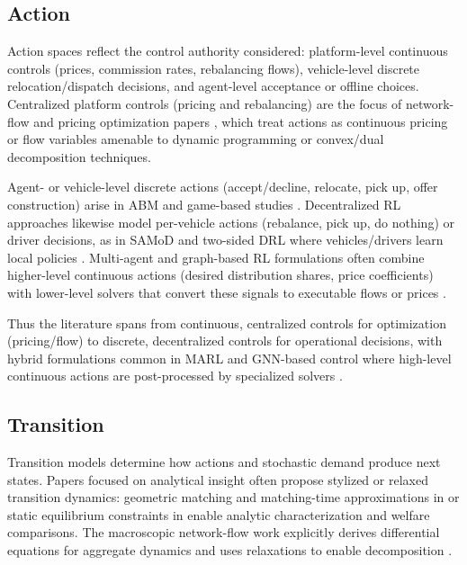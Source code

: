 \subsection{Action}
Action spaces reflect the control authority considered: platform-level continuous controls (prices, commission rates, rebalancing flows), vehicle-level discrete relocation/dispatch decisions, and agent-level acceptance or offline choices. Centralized platform controls (pricing and rebalancing) are the focus of network-flow and pricing optimization papers \citep{spatiotemporal_pricing,geometric_matching,spatial_pricing}, which treat actions as continuous pricing or flow variables amenable to dynamic programming or convex/dual decomposition techniques.

Agent- or vehicle-level discrete actions (accept/decline, relocate, pick up, offer construction) arise in ABM and game-based studies \citep{competition_and_cooperation,modeling_the_competition,hybrid_operations}. Decentralized RL approaches likewise model per-vehicle actions (rebalance, pick up, do nothing) or driver decisions, as in SAMoD and two-sided DRL where vehicles/drivers learn local policies \citep{samod,two_sided}. Multi-agent and graph-based RL formulations often combine higher-level continuous actions (desired distribution shares, price coefficients) with lower-level solvers that convert these signals to executable flows or prices \citep{learning_based,graph_meta,competitive_pricing}.

Thus the literature spans from continuous, centralized controls for optimization (pricing/flow) to discrete, decentralized controls for operational decisions, with hybrid formulations common in MARL and GNN-based control where high-level continuous actions are post-processed by specialized solvers \citep{learning_based,graph_meta,competitive_pricing}.

\subsection{Transition}
Transition models determine how actions and stochastic demand produce next states. Papers focused on analytical insight often propose stylized or relaxed transition dynamics: geometric matching and matching-time approximations in \citep{geometric_matching} or static equilibrium constraints in \citep{spatial_pricing} enable analytic characterization and welfare comparisons. The macroscopic network-flow work explicitly derives differential equations for aggregate dynamics and uses relaxations to enable decomposition \citep{spatiotemporal_pricing}.

